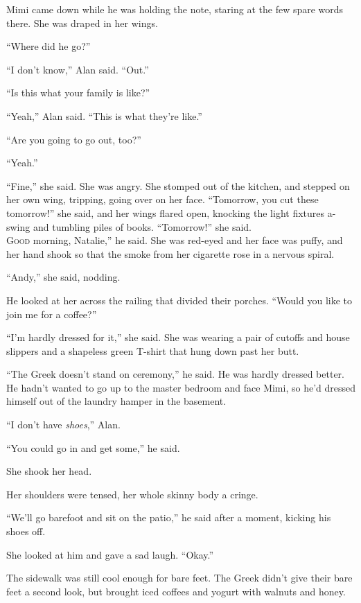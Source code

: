 \documentclass{article}
\begin{document}
Mimi came down while he was holding the note, staring at the few spare
words there.  She was draped in her wings.

``Where did he go?''

``I don't know,'' Alan said.  ``Out.''

``Is this what your family is like?''

``Yeah,'' Alan said.  ``This is what they're like.''

``Are you going to go out, too?''

``Yeah.''

``Fine,'' she said.  She was angry.  She stomped out of the kitchen,
and stepped on her own wing, tripping, going over on her face. 
``Tomorrow, you cut these tomorrow!'' she said, and her wings flared
open, knocking the light fixtures a-swing and tumbling piles of books. 
``Tomorrow!'' she said. 
\\
\lettrine[lines=3, lhang=.5, nindent=0pt, findent=2pt]{G}{ood}
morning, Natalie,'' he said.  She was red-eyed and her face was
puffy, and her hand shook so that the smoke from her cigarette rose in
a nervous spiral.

``Andy,'' she said, nodding. 

He looked at her across the railing that divided their porches. 
``Would you like to join me for a coffee?''

``I'm hardly dressed for it,'' she said.  She was wearing a pair of
cutoffs and house slippers and a shapeless green T-shirt that hung
down past her butt. 

``The Greek doesn't stand on ceremony,'' he said.  He was hardly
dressed better.  He hadn't wanted to go up to the master bedroom and
face Mimi, so he'd dressed himself out of the laundry hamper in the
basement. 

``I don't have \textit{shoes},'' Alan.

``You could go in and get some,'' he said.

She shook her head. 

Her shoulders were tensed, her whole skinny body a cringe.

``We'll go barefoot and sit on the patio,'' he said after a moment,
kicking his shoes off.

She looked at him and gave a sad laugh.  ``Okay.''

The sidewalk was still cool enough for bare feet.  The Greek didn't
give their bare feet a second look, but brought iced coffees and
yogurt with walnuts and honey. 
\end{document}
